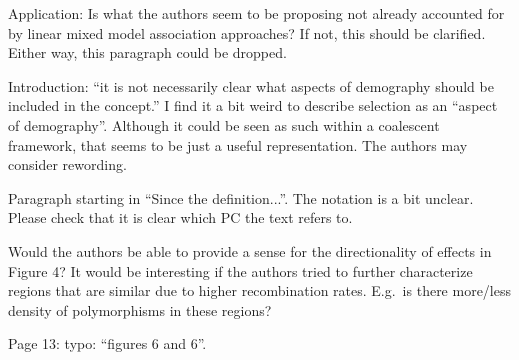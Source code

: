 \begin{point}{Application:}
Is what the authors seem to be proposing not already accounted for by linear
mixed model association approaches? If not, this should be clarified. Either way, this paragraph
could be dropped.
\end{point}


\begin{point}{Introduction:}
 ``it is not necessarily clear what aspects of demography should be included in the
concept.'' I find it a bit weird to describe selection as an ``aspect of demography''. Although it
could be seen as such within a coalescent framework, that seems to be just a useful
representation. The authors may consider rewording.
\end{point}


\begin{point}{}
Paragraph starting in ``Since the definition...''. The notation is a bit unclear. Please check that it
is clear which PC the text refers to.
\end{point}


\begin{point}{}
Would the authors be able to provide a sense for the directionality of effects in Figure 4? It
would be interesting if the authors tried to further characterize regions that are similar due to
higher recombination rates. E.g.\ is there more/less density of polymorphisms in these regions?
\end{point}


\begin{point}{Page 13:}
typo: ``figures 6 and 6''.
\end{point}

